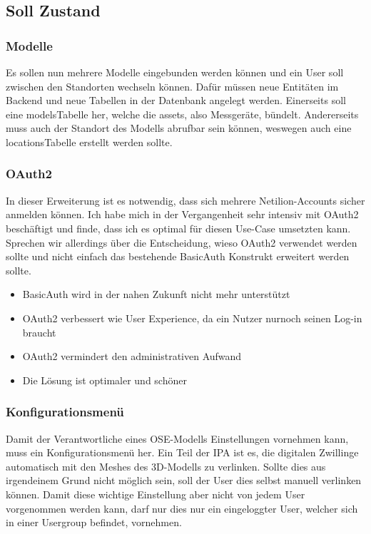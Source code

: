 \subsection{Soll Zustand} \label{soll-zustand}
\subsubsection{Modelle}
Es sollen nun mehrere Modelle eingebunden werden können und ein User soll zwischen den Standorten wechseln können. Dafür müssen neue Entitäten im Backend und neue Tabellen in der Datenbank angelegt werden. Einerseits soll eine \flqq models\frqq Tabelle her, welche die \flqq assets\frqq , also Messgeräte, bündelt. Andererseits muss auch der Standort des Modells abrufbar sein können, weswegen auch eine \flqq locations\frqq Tabelle erstellt werden sollte.
\subsubsection{OAuth2}
In dieser Erweiterung ist es notwendig, dass sich mehrere Netilion-Accounts sicher anmelden können. Ich habe mich in der Vergangenheit sehr intensiv mit OAuth2 beschäftigt und finde, dass ich es optimal für diesen Use-Case umsetzten kann. Sprechen wir allerdings über die Entscheidung, wieso OAuth2 verwendet werden sollte und nicht einfach das bestehende BasicAuth Konstrukt erweitert werden sollte.
\begin{itemize}
  \item BasicAuth wird in der nahen Zukunft nicht mehr unterstützt
  \item OAuth2 verbessert wie User Experience, da ein Nutzer nurnoch seinen Log-in braucht
  \item OAuth2 vermindert den administrativen Aufwand
  \item Die Lösung ist optimaler und schöner
\end{itemize}
\subsubsection{Konfigurationsmenü}
Damit der Verantwortliche eines OSE-Modells Einstellungen vornehmen kann, muss ein Konfigurationsmenü her. Ein Teil der IPA ist es, die digitalen Zwillinge automatisch mit den Meshes des 3D-Modells zu verlinken. Sollte dies aus irgendeinem Grund nicht möglich sein, soll der User dies selbst manuell verlinken können. Damit diese wichtige Einstellung aber nicht von jedem User vorgenommen werden kann, darf nur dies nur ein eingeloggter User, welcher sich in einer Usergroup befindet, vornehmen.
